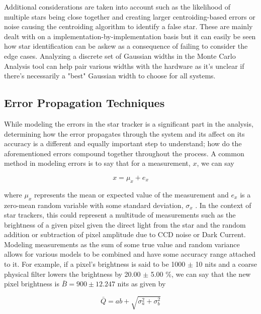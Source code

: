Additional considerations are taken into account such as the likelihood of multiple stars being close together and creating larger centroiding-based errors or noise causing the centroiding algorithm to identify a false star.
These are mainly dealt with on a implementation-by-implementation basis but it can easily be seen how star identification can be askew as a consequence of failing to consider the edge cases.
Analyzing a discrete set of Gaussian widths in the Monte Carlo Analysis tool can help pair various widths with the hardware as it's unclear if there's necessarily a "best" Gaussian width to choose for all systems.

\subsection*{Error Propagation Techniques}
\par \qquad While modeling the errors in the star tracker is a significant part in the analysis, determining how the error propagates through the system and its affect on its accuracy is a different and equally important step to understand; how do the aforementioned errors compound together throughout the process.
A common method in modeling errors is to say that for a measurement, $x$, we can say

\begin{equation}
    x = \mu_x + e_x
\end{equation}

where $\mu_x$ represents the mean or expected value of the measurement and $e_x$ is a zero-mean random variable with some standard deviation, $\sigma_x$ \cite{error_prop_in_imaging}.
In the context of star trackers, this could represent a multitude of measurements such as the brightness of a given pixel given the direct light from the star and the random addition or subtraction of pixel amplitude due to CCD noise or Dark Current.
Modeling measurements as the sum of some true value and random variance allows for various models to be combined and have some accuracy range attached to it.
For example, if a pixel's brightness is said to be 1000 $\pm$ 10 nits and a coarse physical filter lowers the brightness by 20.00 $\pm$ 5.00 \%, we can say that the new pixel brightness is $\bar{B} = 900 \pm 12.247$ nits as given by 

\begin{equation}\label{simple_covar}
    \bar{Q} = ab + \sqrt{\sigma_a^2 + \sigma_b^2}
\end{equation}

